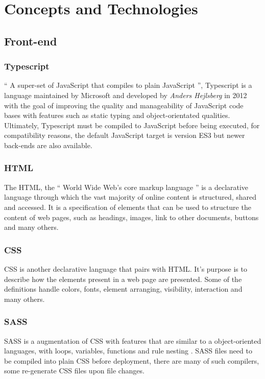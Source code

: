 \chapter{Concepts and Technologies}
\label{cha:concepts}

\section{Front-end}
\label{cha:concepts:sec:frontend}

\subsection{Typescript}
`` A super-set of JavaScript that compiles to plain JavaScript ''\cite{tswebsite}, Typescript is a language maintained by Microsoft and developed by \textit{Anders Hejlsberg} in 2012 with the goal of improving the quality and manageability of JavaScript code bases with features such as static typing and object-orientated qualities\cite{tsrevealed}. Ultimately, Typescript must be compiled to JavaScript before being executed, for compatibility reasons, the default JavaScript target is version ES3 but newer back-ends are also available.

\subsection{HTML}
The \gls{HTML}, the `` World Wide Web's core markup language ''\cite{html} is a declarative language through which the vast majority of online content is structured, shared and accessed. It is a specification of elements that can be used to structure the content of web pages, such as headings, images, link to other documents, buttons and many others\cite{htmlcss}.

\subsection{CSS}
\gls{CSS} is another declarative language that pairs with HTML. It's purpose is to describe how the elements present in a web page are presented.
Some of the definitions handle colors, fonts, element arranging, visibility, interaction and many others\cite{htmlcss}.

\subsection{SASS}
\gls{SASS} is a augmentation of CSS with features that are similar to a object-oriented languages, with loops, variables, functions and rule nesting \cite{sass}. SASS files need to be compiled into plain CSS before deployment, there are many of such compilers, some re-generate CSS files upon file  changes.

